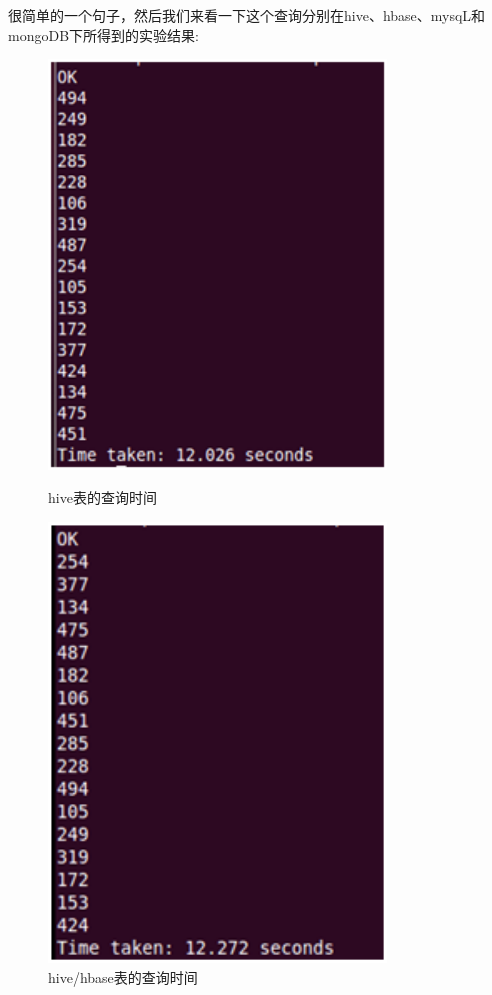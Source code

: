 很简单的一个句子，然后我们来看一下这个查询分别在hive、hbase、mysqL和mongoDB下所得到的实验结果:
\begin{description}

\item
\begin{figure}[h]
\begin{minipage}[t]{0.45\linewidth}
\centering
\includegraphics[width=0.8\textwidth]{photo/xjh1.png}
\caption{hive表的查询时间}
\end{minipage}
\hfill
\begin{minipage}[t]{0.45\linewidth}
\centering
\includegraphics[width=0.8\textwidth]{photo/xjh2.png}
\caption{hive/hbase表的查询时间}
\end{minipage}
\end{figure}


\end{description}
